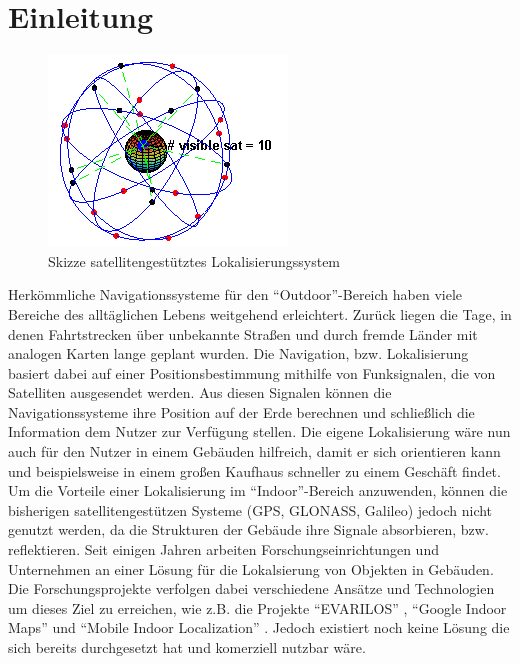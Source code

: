 \chapter{Einleitung}
\begin{figure}
\centering
\includegraphics[scale=0.8]{Bilder/GPS.png} 
\caption{Skizze satellitengestütztes Lokalisierungssystem \cite{GPS}}
\label{GPS}
\end{figure}
Herkömmliche Navigationssysteme für den "`Outdoor"'-Bereich haben viele Bereiche des alltäglichen Lebens weitgehend erleichtert. Zurück liegen die Tage, in denen Fahrtstrecken über unbekannte Straßen und durch fremde Länder mit analogen Karten lange geplant wurden. Die Navigation, bzw. Lokalisierung basiert dabei auf einer Positionsbestimmung mithilfe von Funksignalen, die von Satelliten ausgesendet werden. Aus diesen Signalen können die Navigationssysteme ihre Position auf der Erde berechnen und schließlich die Information dem Nutzer zur Verfügung stellen. Die eigene Lokalisierung wäre nun auch für den Nutzer in einem Gebäuden hilfreich, damit er sich orientieren kann und beispielsweise in einem großen Kaufhaus schneller zu einem Geschäft findet. Um die Vorteile einer Lokalisierung im "`Indoor"'-Bereich anzuwenden, können die bisherigen satellitengestützen Systeme (GPS, GLONASS, Galileo) jedoch nicht genutzt werden, da die Strukturen der Gebäude ihre Signale absorbieren, bzw. reflektieren. Seit einigen Jahren arbeiten Forschungseinrichtungen und Unternehmen an einer Lösung für die Lokalsierung von Objekten in Gebäuden. Die Forschungsprojekte verfolgen dabei verschiedene Ansätze und Technologien um dieses Ziel zu erreichen, wie z.B. die Projekte "`EVARILOS"' \cite{EVA}, "`Google Indoor Maps"' \cite{GIM} und "`Mobile Indoor Localization"' \cite{MIL}. Jedoch existiert noch keine Lösung die sich bereits durchgesetzt hat und komerziell nutzbar wäre.\\ \\
